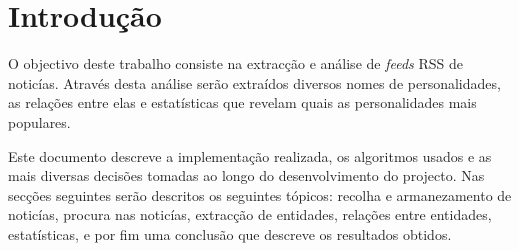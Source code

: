 \section{Introdução}
O objectivo deste trabalho consiste na extracção e análise de \textit{feeds} RSS de noticías. Através desta análise serão extraídos diversos nomes de personalidades, as relações entre elas e estatísticas que revelam quais as personalidades mais populares.

Este documento descreve a implementação realizada, os algoritmos usados e as mais diversas decisões tomadas ao longo do desenvolvimento do projecto. Nas secções seguintes serão descritos os seguintes tópicos: recolha e armanezamento de noticías, procura nas noticías, extracção de entidades, relações entre entidades, estatísticas, e por fim uma conclusão que descreve os resultados obtidos.